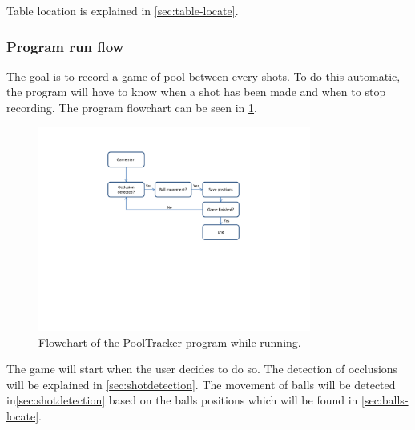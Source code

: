 Table location is explained in \ref{sec:table-locate}.\\




\subsubsection{Program run flow}
The goal is to record a game of pool between every shots. To do this automatic, the program will have to know when a shot has been made and when to stop recording. The program flowchart can be seen in \ref{fig:program_flowchart}.\\

\begin{figure}[H]
\begin{center}
\leavevmode
\includegraphics[width=0.8\textwidth]{images/program_flowchart}
\end{center}
\caption{Flowchart of the PoolTracker program while running.}
\label{fig:program_flowchart}
\end{figure}

The game will start when the user decides to do so. The detection of occlusions will be explained in \ref{sec:shotdetection}. The movement of balls will be detected in\ref{sec:shotdetection} based on the balls positions which will be found in \ref{sec:balls-locate}.